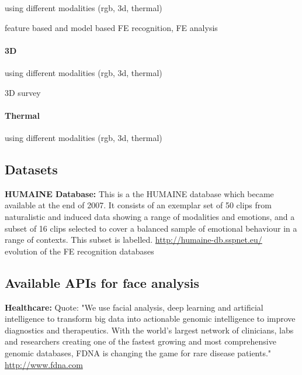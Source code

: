 using different modalities (rgb, 3d, thermal)\cite{Corneanu2016survey}

feature based and model based FE recognition\cite{Mishra2015}, FE analysis \cite{Tian2005}

\paragraph{3D}
using different modalities (rgb, 3d, thermal)\cite{Corneanu2016survey}

3D \cite{Danelakis2015}survey\cite{Sandbach2012survey}
\paragraph{Thermal}
using different modalities (rgb, 3d, thermal)\cite{Corneanu2016survey}







\subsection{Datasets}

\textbf{HUMAINE Database:} 
This is a the HUMAINE database which became available at the end of 2007. It consists of an exemplar set of 50 clips from naturalistic and induced data showing a range of modalities and emotions, and a subset of 16 clips selected to cover a balanced sample of emotional behaviour in a range of contexts. This subset is labelled. \url{http://humaine-db.sspnet.eu/}\\


evolution of the FE recognition databases \cite{Roychowdhury2015survey}\\


\subsection{Available APIs for face analysis}

\textbf{Healthcare:} 
Quote: "We use facial analysis, deep learning and artificial intelligence to transform big data into actionable genomic intelligence to improve diagnostics and therapeutics. With the world’s largest network of clinicians, labs and researchers creating one of the fastest growing and most comprehensive genomic databases, FDNA is changing the game for rare disease patients."
\url{http://www.fdna.com}\\


